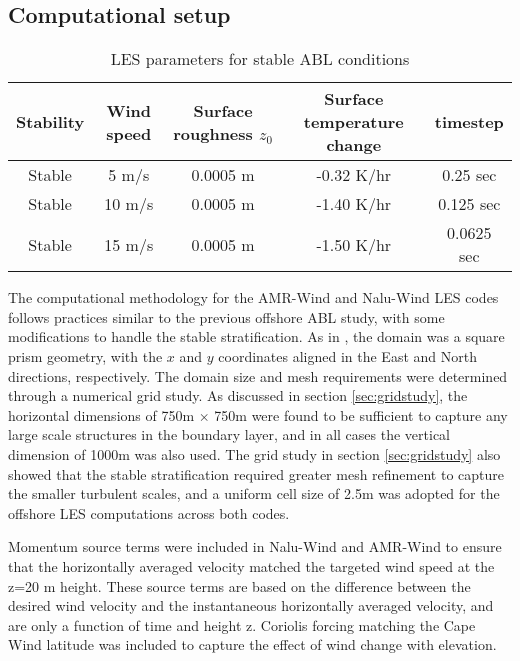 
\subsection{\label{sec:CFDsetup}Computational setup}


\begin{table}
\caption{\label{tab:z0tempparam} LES parameters for stable ABL conditions}
\centering
\begin{tabular}{ccccc}
  \hline
  Stability & Wind speed & Surface roughness $z_0$ & Surface
  temperature change & timestep\\
  \hline
  Stable       & 5  m/s           & 0.0005 m       & -0.32 K/hr   & 0.25 sec   \\
  Stable       & 10 m/s           & 0.0005 m       & -1.40 K/hr   & 0.125 sec  \\
  Stable       & 15 m/s           & 0.0005 m       & -1.50 K/hr   & 0.0625 sec \\
\hline
\end{tabular}
\end{table}

The computational methodology for the AMR-Wind and Nalu-Wind LES codes
follows practices similar to the previous offshore ABL study, with
some modifications to handle the stable stratification.  As in
\cite{cheung2020large}, the domain was a square prism geometry, with
the $x$ and $y$ coordinates aligned in the East and North directions,
respectively.  The domain size and mesh requirements were determined
through a numerical grid study.  As discussed in section
\ref{sec:gridstudy}, the horizontal dimensions of 750m $\times$ 750m
were found to be sufficient to capture any large scale structures in
the boundary layer, and in all cases the vertical dimension of 1000m
was also used.  The grid study in section \ref{sec:gridstudy} also
showed that the stable stratification required greater mesh refinement
to capture the smaller turbulent scales, and a uniform cell size of
2.5m was adopted for the offshore LES computations across both codes.

Momentum source terms were included in Nalu-Wind and AMR-Wind to
ensure that the horizontally averaged velocity matched the targeted
wind speed at the z=20 m height.  These source terms are based on the
difference between the desired wind velocity and the instantaneous
horizontally averaged velocity, and are only a function of time and
height z.  Coriolis forcing matching the Cape Wind latitude was
included to capture the effect of wind change with elevation.


